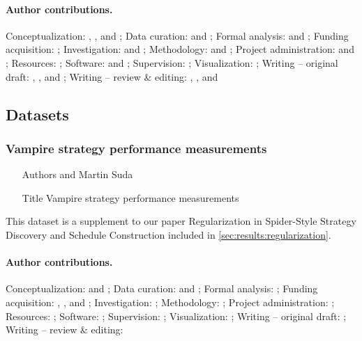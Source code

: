 \paragraph{Author contributions.}
Conceptualization:            \MS{}, \KC{}, and \FB{};
Data curation:                \MS{} and \KC{};
Formal analysis:              \MS{} and \KC{};
Funding acquisition:          \MS{};
Investigation:                \KC{} and \MS{};
Methodology:                  \MS{} and \KC{};
Project administration:       \MS{} and \FB{};
Resources:                    \JU{};
Software:                     \KC{} and \MS{};
Supervision:                  \MS{};
Visualization:                \MS{};
Writing -- original draft:    \MS{}, \KC{}, and \FB{};
Writing -- review \& editing: \FB{}, \MS{}, and \KC{}

\subsection{Datasets}

\subsubsection{Vampire strategy performance measurements}

\begin{itemize}
\item[Authors]  and Martin Suda
\item[Title] Vampire strategy performance measurements \cite{bartek10814478}
\end{itemize}

This dataset is a supplement to our paper
Regularization in Spider-Style Strategy Discovery and Schedule Construction
\cite{DBLP:conf/ijcar/BartekCS24}
included in \cref{sec:results:regularization}.

\paragraph{Author contributions.}
Conceptualization:            \FB{} and \MS{};
Data curation:                \FB{} and \MS{};
Formal analysis:              \FB{};
Funding acquisition:          \MS{}, \JU{}, and \FB{};
Investigation:                \FB{};
Methodology:                  \FB{};
Project administration:       \MS{};
Resources:                    \JU{};
Software:                     \FB{};
Supervision:                  \MS{};
Visualization:                \FB{};
Writing -- original draft:    \FB{};
Writing -- review \& editing: \MS{}
